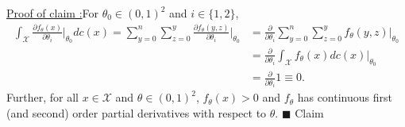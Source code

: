 \documentclass[12pt]{article}
\newcounter{ProofCounter}
\newcounter{ClaimCounter}[ProofCounter]
\newenvironment{claim}[1]{\vspace{1mm}\stepcounter{ClaimCounter}\par\noindent\underline{\bf Claim \theClaimCounter:}\space#1}{}
\newenvironment{claimproof}[1]{\par\noindent\underline{Proof of claim \theClaimCounter:}\space#1}{\hfill $\blacksquare$ Claim \theClaimCounter}
\begin{document}
\begin{claimproof}
  For $\theta_0 \in (0,1)^{2}$ and $i \in \{1,2\}$,
  \begin{align*}
    \int_{\mathcal{X}} \frac{\partial f_{\theta}(x) }{\partial \theta_i}\bigg|_{\theta_0} dc(x) = \sum_{y=0}^{n}\sum_{z=0}^{y}\frac{\partial
    f_{\theta}(y,z)}{\partial \theta_i}\bigg|_{\theta_0} 
    & = \frac{\partial}{\partial \theta_i} \sum_{y=0}^{n}\sum_{z=0}^{y}f_{\theta}(y,z) \bigg|_{\theta_0} \\
    & = \frac{\partial}{\partial \theta_i} \int_{\mathcal{X}}f_{\theta}(x)dc(x)\bigg|_{\theta_0} \\
    & = \frac{\partial}{\partial \theta_i} 1 \equiv 0.
  \end{align*}
  Further, for all $x \in \mathcal{X}$ and $\theta \in (0,1)^{2}$, $f_{\theta}(x) > 0$ and $f_{\theta}$ has continuous first (and second) order partial
  derivatives with respect to $\theta$.
\end{claimproof}
\end{document}
